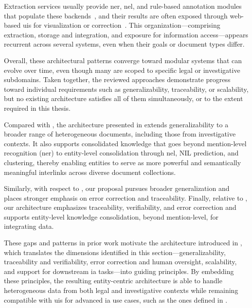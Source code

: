 Extraction services usually provide \ac{ner}, \ac{nel}, and rule-based annotation modules that populate these backends~\cite{boella2019semi,P_rez_2021,bellandi2025streamlining,beniamino_strada_2022}, and their results are often exposed through web-based \acp{ui} for visualization or correction~\cite{boella2019semi,HAN2024121052legalasst,bellandi2025streamlining,beniamino_strada_2022}. 
This organization---comprising extraction, storage and integration, and exposure for information access---appears recurrent across several systems, even when their goals or document types differ.

\medskip
\noindent
Overall, these architectural patterns converge toward modular systems that can evolve over time, even though many are scoped to specific legal or investigative subdomains. 
Taken together, the reviewed approaches demonstrate progress toward individual requirements such as generalizability, traceability, or scalability, but no existing architecture satisfies all of them simultaneously, or to the extent required in this thesis.

Compared with \textcite{breit_legal_permits_2020}, the architecture presented in  extends generalizability to a broader range of heterogeneous documents, including those from investigative contexts. 
It also supports consolidated knowledge that goes beyond mention-level recognition (\acl{ner}) to entity-level consolidation through \acl{nel}, NIL prediction, and clustering, thereby enabling entities to serve as more powerful and semantically meaningful interlinks across diverse document collections.

Similarly, with respect to \textcite{bellandi2025streamlining}, our proposal pursues broader generalization and places stronger emphasis on error correction and traceability. 
Finally, relative to \textcite{P_rez_2021}, our architecture emphasizes traceability, verifiability, and error correction and supports entity-level knowledge consolidation, beyond mention-level, for integrating data.






These gaps and patterns in prior work motivate the architecture introduced in , which translates the dimensions identified in this section---generalizability, traceability and verifiability, error correction and human oversight, scalability, and support for downstream \acl{ia} tasks---into guiding principles. By embedding these principles, the resulting entity-centric architecture is able to handle heterogeneous data from both legal and investigative contexts while remaining compatible with \acp{ui} for advanced \acl{ia} use cases, such as the ones defined in .





